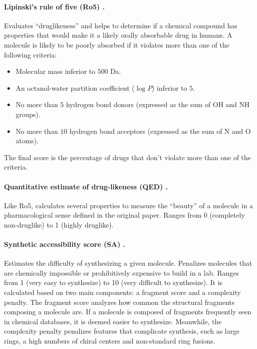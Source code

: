 \documentclass[a4paper,12pt]{article}
\begin{document}
\paragraph{Lipinski’s rule of five (Ro5) {\normalfont\parencite{Lipinski1997}}.} Evaluates ``druglikeness'' and helps to determine if a chemical compound has properties that would make it a likely orally absorbable drug in humans. A molecule is likely to be poorly absorbed if it violates more than one of the following criteria:

\begin{itemize}
    \item Molecular mass inferior to $500$ Da.
    \item An octanol-water partition coefficient ($\log P$) inferior to $5$.
    \item No more than $5$ hydrogen bond donors (expressed as the sum of OH and NH groups).
    \item No more than $10$ hydrogen bond acceptors (expressed as the sum of N and O atoms).
\end{itemize}

The final score is the percentage of drugs that don't violate more than one of the criteria.

\paragraph{Quantitative estimate of drug-likeness (QED) {\normalfont\parencite{Bickerton2012QED}}.} Like Ro5, calculates several properties to measure the ``beauty'' of a molecule in a pharmacological sense defined in the original paper. Ranges from 0 (completely non-druglike) to 1 (highly druglike).

\paragraph{Synthetic accessibility score (SA) {\normalfont\parencite{Ertl2009SA}}.} Estimates the difficulty of synthesizing a given molecule. Penalizes molecules that are chemically impossible or prohibitively expensive to build in a lab. Ranges from 1 (very easy to synthesize) to 10 (very difficult to synthesize). It is calculated based on two main components: a fragment score and a complexity penalty. The fragment score analyzes how common the structural fragments composing a molecule are. If a molecule is composed of fragments frequently seen in chemical databases, it is deemed easier to synthesize. Meanwhile, the complexity penalty penalizes features that complicate synthesis, such as large rings, a high numbers of chiral centers and non-standard ring fusions.
\end{document}
